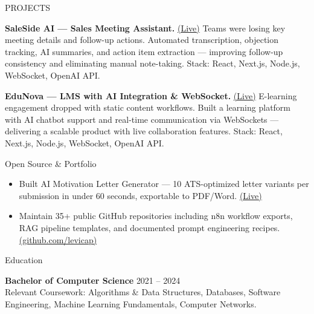 \documentclass{resume}
\begin{document}
\begin{rSection}{PROJECTS}
\item \textbf{SaleSide AI — Sales Meeting Assistant.} \href{https://saleside.ai/}{(Live)} {Teams were losing key meeting details and follow-up actions. Automated transcription, objection tracking, AI summaries, and action item extraction — improving follow-up consistency and eliminating manual note-taking. Stack: React, Next.js, Node.js, WebSocket, OpenAI API.}

\item \textbf{EduNova — LMS with AI Integration \& WebSocket.} \href{https://e-learning-five-tau.vercel.app/}{(Live)} {E-learning engagement dropped with static content workflows. Built a learning platform with AI chatbot support and real-time communication via WebSockets — delivering a scalable product with live collaboration features. Stack: React, Next.js, Node.js, WebSocket, OpenAI API.}

\end{rSection}


\begin{rSection}{Open Source \& Portfolio}
\begin{itemize}
    \item Built AI Motivation Letter Generator — 10 ATS-optimized letter variants per submission in under 60 seconds, exportable to PDF/Word. \href{https://motivation-letter-ai.vercel.app/}{(Live)}
    \item Maintain 35+ public GitHub repositories including n8n workflow exports, RAG pipeline templates, and documented prompt engineering recipes. \href{https://github.com/levicap}{(github.com/levicap)}
\end{itemize}
\end{rSection}


\begin{rSection}{Education}

{\bf Bachelor of Computer Science} \hfill {2021 -- 2024} \\
Relevant Coursework: Algorithms \& Data Structures, Databases, Software Engineering, Machine Learning Fundamentals, Computer Networks.

\end{rSection}
\end{document}
